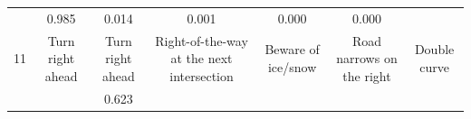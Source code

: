 \documentclass[11pt]{article}
\begin{document}
\begin{longtable}[]{@{}ccccccc@{}}
\begin{minipage}[t]{0.04\columnwidth}
\end{minipage} & \begin{minipage}[t]{0.04\columnwidth}\centering\strut
0.985\strut
\end{minipage} & \begin{minipage}[t]{0.04\columnwidth}\centering\strut
0.014\strut
\end{minipage} & \begin{minipage}[t]{0.04\columnwidth}\centering\strut
0.001\strut
\end{minipage} & \begin{minipage}[t]{0.04\columnwidth}\centering\strut
0.000\strut
\end{minipage} & \begin{minipage}[t]{0.04\columnwidth}\centering\strut
0.000\strut
\end{minipage}\tabularnewline
\begin{minipage}[t]{0.04\columnwidth}\centering\strut
11\strut
\end{minipage} & \begin{minipage}[t]{0.04\columnwidth}\centering\strut
Turn right ahead\strut
\end{minipage} & \begin{minipage}[t]{0.04\columnwidth}\centering\strut
Turn right ahead\strut
\end{minipage} & \begin{minipage}[t]{0.04\columnwidth}\centering\strut
Right-of-the-way at the next intersection\strut
\end{minipage} & \begin{minipage}[t]{0.04\columnwidth}\centering\strut
Beware of ice/snow\strut
\end{minipage} & \begin{minipage}[t]{0.04\columnwidth}\centering\strut
Road narrows on the right\strut
\end{minipage} & \begin{minipage}[t]{0.04\columnwidth}\centering\strut
Double curve\strut
\end{minipage}\tabularnewline
\begin{minipage}[t]{0.04\columnwidth}\centering\strut
\strut
\end{minipage} & \begin{minipage}[t]{0.04\columnwidth}\centering\strut
\strut
\end{minipage} & \begin{minipage}[t]{0.04\columnwidth}\centering\strut
0.623\strut
\end{minipage} & \begin{minipage}[t]{0.04\columnwidth}\centering\strut

\end{minipage}
\end{longtable}
\end{document}

